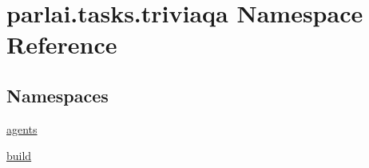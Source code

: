 \hypertarget{namespaceparlai_1_1tasks_1_1triviaqa}{}\section{parlai.\+tasks.\+triviaqa Namespace Reference}
\label{namespaceparlai_1_1tasks_1_1triviaqa}
\subsection*{Namespaces}
\begin{DoxyCompactItemize}
\item 
 \hyperlink{namespaceparlai_1_1tasks_1_1triviaqa_1_1agents}{agents}
\item 
 \hyperlink{namespaceparlai_1_1tasks_1_1triviaqa_1_1build}{build}
\end{DoxyCompactItemize}
